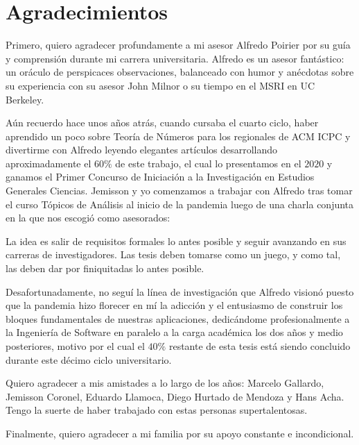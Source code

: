 \chapter*{Agradecimientos}
\thispagestyle{empty}

\vspace{-0.5cm}

Primero, quiero agradecer profundamente a mi asesor Alfredo Poirier
por su guía y comprensión durante mi carrera universitaria.
Alfredo es un asesor fantástico:
un oráculo de perspicaces observaciones,
balanceado con humor
y anécdotas sobre su experiencia
con su asesor John Milnor
o su tiempo en el MSRI en UC Berkeley.

Aún recuerdo hace unos años atrás,
cuando cursaba el cuarto ciclo,
haber aprendido un poco sobre Teoría de Números
para los regionales de ACM ICPC
y divertirme con Alfredo
leyendo elegantes artículos
desarrollando aproximadamente el \(60\%\) de este trabajo,
el cual lo presentamos en el \(2020\)
y ganamos el
Primer Concurso de Iniciación a la Investigación en Estudios Generales Ciencias.
Jemisson y yo comenzamos a trabajar con Alfredo
tras tomar el curso Tópicos de Análisis al inicio de la pandemia
luego de una charla conjunta en la que nos escogió como asesorados:

\begin{displayquote}
La idea es salir de requisitos formales lo antes posible
y seguir avanzando en sus carreras de investigadores.
Las tesis deben tomarse como un juego,
y como tal,
las deben dar por finiquitadas lo antes posible.
\end{displayquote}

Desafortunadamente,
no seguí la línea de investigación
que Alfredo visionó
puesto que la pandemia
hizo florecer en mí
la adicción y el entusiasmo de construir
los bloques fundamentales de nuestras aplicaciones,
dedicándome profesionalmente
a la Ingeniería de Software
en paralelo a la carga académica
los dos años y medio posteriores,
motivo por el cual el \(40\%\) restante de esta tesis
está siendo concluido durante este décimo ciclo universitario.

Quiero agradecer a mis amistades a lo largo de los años:
Marcelo Gallardo,
Jemisson Coronel,
Eduardo Llamoca,
Diego Hurtado de Mendoza
y
Hans Acha.
Tengo la suerte de haber trabajado con estas personas supertalentosas.

Finalmente, quiero agradecer a mi familia por su apoyo constante e incondicional.
